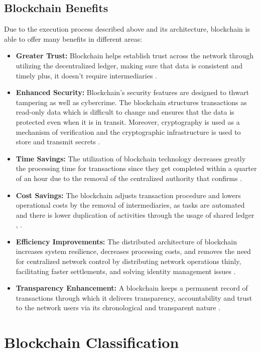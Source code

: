 \subsection{Blockchain Benefits}

Due to the execution process described above and its architecture, blockchain is able to offer many benefits in different areas:

\begin{itemize}
  \item \textbf{Greater Trust:} Blockchain helps establish trust across the network through utilizing the decentralized ledger, making sure that data is consistent and 
  timely plus, it doesn’t require intermediaries \cite{9596538}. 
  \item \textbf{Enhanced Security:} Blockchain's security features are designed to thwart tampering as well as cybercrime. The blockchain structures transactions as 
  read-only data which is difficult to change and ensures that the data is protected even when it is in transit. Moreover, cryptography is used as a mechanism of 
  verification and the cryptographic infrastructure is used to store and transmit secrets \cite{ibm_blockchain}.
  \item \textbf{Time Savings:} The utilization of blockchain technology decreases greatly the processing time for transactions since they get completed within a quarter of 
  an hour due to the removal of the centralized authority that confirms \cite{ibm_blockchain}.
  \item \textbf{Cost Savings:} The blockchain adjusts transaction procedure and lowers operational costs by the removal of intermediaries, as tasks are automated and there 
  is lower duplication of activities through the usage of shared ledger \cite{9596538}, \cite{9036241}.
  \item \textbf{Efficiency Improvements:} The distributed architecture of blockchain increases system resilience, decreases processing costs, and removes the need for 
  centralized network control by distributing network operations thinly, facilitating faster settlements, and solving identity management issues \cite{9036241}.
  \item \textbf{Transparency Enhancement:} A blockchain keeps a permanent record of transactions through which it delivers transparency, accountability and trust to the 
  network users via its chronological and transparent nature \cite{9036241}.
\end{itemize}

\section{Blockchain Classification}

